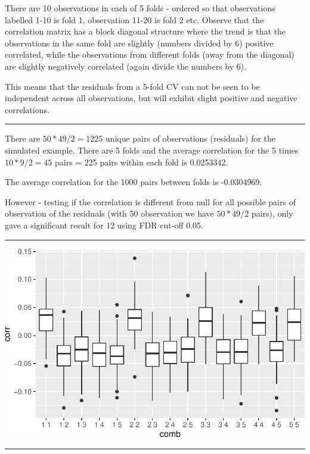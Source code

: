 \documentclass[
  letterpaper,
  DIV=11,
  numbers=noendperiod]{scrartcl}
\begin{document}
There are 10 observations in each of 5 folds - ordered so that
observations labelled 1-10 is fold 1, observation 11-20 is fold 2 etc.
Observe that the correlation matrix has a block diagonal structure where
the trend is that the observations in the same fold are slightly
(numbers divided by 6) positive correlated, while the observations from
different folds (away from the diagonal) are slightly negatively
correlated (again divide the numbers by 6).

This means that the residuals from a 5-fold CV can not be seen to be
independent across all observations, but will exhibit slight positive
and negative correlations.

\begin{center}\rule{0.5\linewidth}{0.5pt}\end{center}

There are \(50*49/2=1225\) unique pairs of observations (residuals) for
the simulated example. There are 5 folds and the average correlation for
the 5 times \(10*9/2=45\) pairs = 225 pairs within each fold is
0.0253342.

The average correlation for the 1000 pairs between folds is -0.0304969.

However - testing if the correlation is different from null for all
possible pairs of observation of the residuals (with 50 observation we
have \(50*49/2\) pairs), only gave a significant result for 12 using FDR
cut-off 0.05.

\begin{center}\rule{0.5\linewidth}{0.5pt}\end{center}

\includegraphics{L17v2_files/figure-pdf/unnamed-chunk-23-1.pdf}

\begin{center}\rule{0.5\linewidth}{0.5pt}\end{center}
\end{document}
